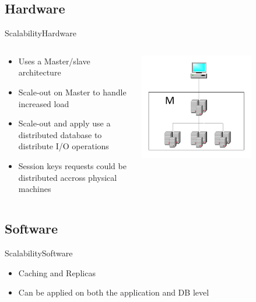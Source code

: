 \subsection{Hardware}
\begin{frame}{Scalability}{Hardware}
  \begin{columns}[T]
    \begin{column}{.5\textwidth}
     \begin{block}{}
    \begin{itemize}
  	\item Uses a Master/slave architecture
    \item Scale-out on Master to handle increased load
    \item Scale-out and apply use a distributed database to distribute I/O operations
    \item Session keys requests could be distributed accross physical machines
    \end{itemize}
    \end{block}
    \end{column}
    \begin{column}{.5\textwidth}
    \begin{block}{}
    \begin{center}
    \includegraphics[width=0.7\textwidth]{images/master_scaling.pdf}
    \end{center}
    \end{block}
    \end{column}
\end{columns}\end{frame}



\subsection{Software}
\begin{frame}{Scalability}{Software}
  \begin{itemize}
    \item Caching and Replicas
    \item Can be applied on both the application and DB level
  \end{itemize}
\end{frame}

